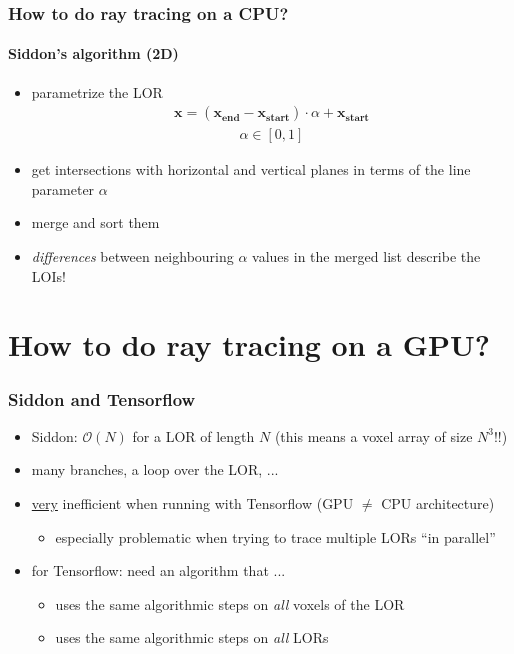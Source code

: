 \documentclass{beamer}
\begin{document}
\begin{frame}
  \frametitle{How to do ray tracing on a CPU?}
  \framesubtitle{Siddon's algorithm (2D)}
  \begin{itemize}
    \item parametrize the LOR
      \begin{align*} \mathbf{x} = (\mathbf{x_{end}} - \mathbf{x_{start}}) \cdot \alpha + \mathbf{x_{start}} \end{align*}
      \begin{align*} \alpha \in [0,1] \end{align*}
    \item get intersections with horizontal and vertical planes in terms of the line parameter $\alpha$
    \item merge and sort them
    \item \textsl{differences} between neighbouring $\alpha$ values in the merged list describe the LOIs!
  \end{itemize}
\end{frame}

\section{How to do ray tracing on a GPU?}
\begin{frame}
  \frametitle{Siddon and Tensorflow}
  \begin{itemize}
    \item Siddon: $\mathcal{O}(N)$ for a LOR of length $N$ (this means a voxel array of size $N^3$!!)
    \item many branches, a loop over the LOR, ...
    \item \underline{very} inefficient when running with Tensorflow (GPU $\neq$ CPU architecture)
      \begin{itemize}
        \item especially problematic when trying to trace multiple LORs ``in parallel''
      \end{itemize}

    \item for Tensorflow: need an algorithm that ...
      \begin{itemize}
        \item uses the same algorithmic steps on \textsl{all} voxels of the LOR
        \item uses the same algorithmic steps on \textsl{all} LORs
      \end{itemize}
  \end{itemize}
\end{frame}
\end{document}
